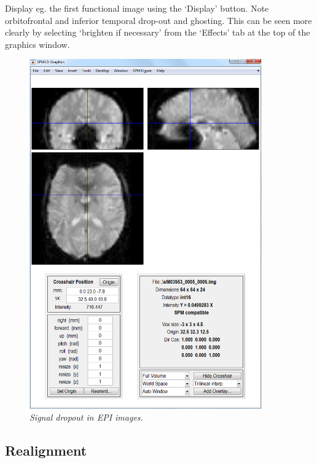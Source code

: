 \documentclass[a4paper,titlepage]{book}
\begin{document}
Display eg. the first functional image using the 
`Display' button. Note orbitofrontal 
  and inferior temporal drop-out and ghosting. This 
  can be seen more clearly by selecting `brighten if necessary' from the `Effects' tab at the top of the 
  graphics window.
  \begin{figure}
\begin{center}
\includegraphics[width=100mm]{faces/dropout}
\caption{\em Signal dropout in EPI images. \label{dropout}}
\end{center}
\end{figure}

\subsection{Realignment}
\end{document}
